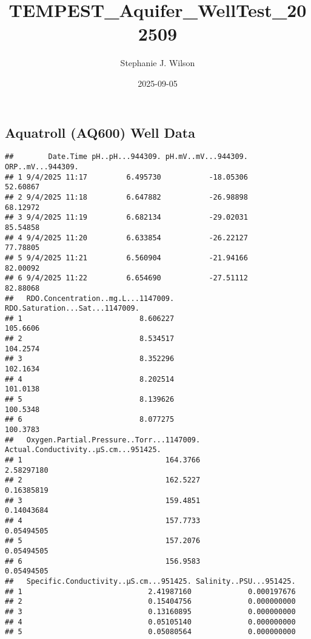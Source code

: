 \documentclass[
]{article}
\title{TEMPEST\_Aquifer\_WellTest\_202509}
\author{Stephanie J. Wilson}
\date{2025-09-05}
\begin{document}
\maketitle

\hypertarget{aquatroll-aq600-well-data}{%
\subsection{Aquatroll (AQ600) Well
Data}\label{aquatroll-aq600-well-data}}

\begin{verbatim}
##        Date.Time pH..pH...944309. pH.mV..mV...944309. ORP..mV...944309.
## 1 9/4/2025 11:17         6.495730           -18.05306          52.60867
## 2 9/4/2025 11:18         6.647882           -26.98898          68.12972
## 3 9/4/2025 11:19         6.682134           -29.02031          85.54858
## 4 9/4/2025 11:20         6.633854           -26.22127          77.78805
## 5 9/4/2025 11:21         6.560904           -21.94166          82.00092
## 6 9/4/2025 11:22         6.654690           -27.51112          82.88068
##   RDO.Concentration..mg.L...1147009. RDO.Saturation...Sat...1147009.
## 1                           8.606227                        105.6606
## 2                           8.534517                        104.2574
## 3                           8.352296                        102.1634
## 4                           8.202514                        101.0138
## 5                           8.139626                        100.5348
## 6                           8.077275                        100.3783
##   Oxygen.Partial.Pressure..Torr...1147009. Actual.Conductivity..µS.cm...951425.
## 1                                 164.3766                           2.58297180
## 2                                 162.5227                           0.16385819
## 3                                 159.4851                           0.14043684
## 4                                 157.7733                           0.05494505
## 5                                 157.2076                           0.05494505
## 6                                 156.9583                           0.05494505
##   Specific.Conductivity..µS.cm...951425. Salinity..PSU...951425.
## 1                             2.41987160             0.000197676
## 2                             0.15404756             0.000000000
## 3                             0.13160895             0.000000000
## 4                             0.05105140             0.000000000
## 5                             0.05080564             0.000000000

\end{verbatim}
\end{document}
